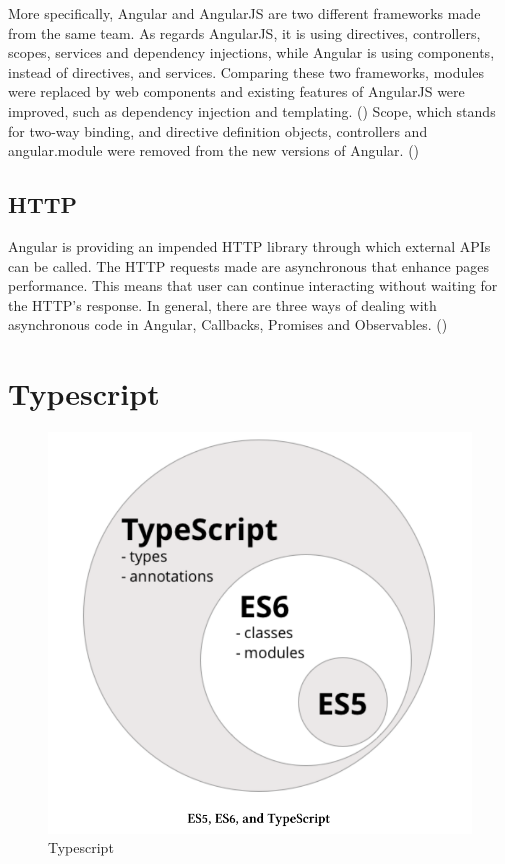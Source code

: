 More specifically, Angular and AngularJS are two different frameworks made from the same team. As regards AngularJS, it is using directives, controllers, scopes, services and dependency injections, while Angular is using components, instead of directives, and services. Comparing these two frameworks, modules were replaced by web components and existing features of AngularJS were improved, such as dependency injection and templating. (\cite{angularUpandRunning}) Scope, which stands for two-way binding, and directive definition objects, controllers and angular.module were removed from the new versions of Angular. (\cite{murray2018ng}) \par

\subsection{HTTP}

Angular is providing an impended HTTP library through which external APIs can be called. The HTTP requests made are asynchronous that enhance pages performance. This means that user can continue interacting without waiting for the HTTP's response. In general, there are three ways of dealing with asynchronous code in Angular, Callbacks, Promises and Observables. (\cite{murray2018ng})

\section{Typescript}

\begin{figure}
	\begin{center}
		\includegraphics[scale=0.25]{images/Typescript.png}
	\end{center}
	\caption{Typescript}
\end{figure}


